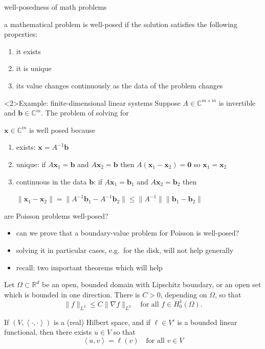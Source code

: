 \documentclass[10pt,
               svgnames,
               hyperref={colorlinks,
                         citecolor=DeepPink4,
                         linkcolor=FireBrick,
                         urlcolor=blue},
               usepdftitle=false]{beamer}
\newcommand{\bb}{\mathbf{b}}
\newcommand{\bx}{\mathbf{x}}
\newcommand{\bzero}{\bm{0}}
\newcommand{\CC}{\mathbb{C}}
\newcommand{\RR}{\mathbb{R}}
\newcommand{\grad}{\nabla}
\newcommand{\ip}[2]{\left<#1,#2\right>}
\begin{document}
\begin{frame}{well-posedness of math problems}

\begin{definition}[Hadamard, 1902]
a mathematical problem is \alert{well-posed} if the solution satisfies the following properties:
\begin{enumerate}
\item it exists
\item it is unique
\item its value changes continuously as the data of the problem changes
\end{enumerate}
\end{definition}

\small
\begin{block}<2>{Example: finite-dimensional linear systems}
Suppose $A\in \CC^{m\times m}$ is invertible and $\bb\in\CC^m$.  The problem of solving \only<1>{$A\bx = \bb$}\only<2>{$\boxed{A\bx = \bb}$} for

$\bx\in\CC^m$ is well posed because
\begin{enumerate}
\item exists: $\bx = A^{-1}\bb$
\item unique: if $A\bx_1=\bb$ and $A\bx_2=\bb$ then $A(\bx_1-\bx_2)=\bzero$ so $\bx_1=\bx_2$
\item continuous in the data $\bb$: if $A\bx_1=\bb_1$ and $A\bx_2=\bb_2$ then

\quad $\|\bx_1-\bx_2\| = \|A^{-1}\bb_1 - A^{-1}\bb_2\| \le \|A^{-1}\| \|\bb_1 - \bb_2\|$
\end{enumerate}
\end{block}
\end{frame}


\begin{frame}{are Poisson problems well-posed?}

\begin{itemize}
\item can we prove that a boundary-value problem for Poisson is well-posed?
\item solving it in particular cases, e.g.~for the disk, will not help generally
\item recall: two important theorems which will help
\end{itemize}

\begin{theorem}
Let $\Omega\subset \RR^d$ be an open, bounded domain with Lipschitz boundary, or an open set which is bounded in one direction.  There is $C>0$, depending on $\Omega$, so that
	$$\|f\|_{L^2} \le C \|\grad f\|_{L^2} \quad \text{for all } f\in H_0^1(\Omega).$$
\end{theorem}

\begin{theorem}
If $(V,\ip{\cdot}{\cdot})$ is a (real) Hilbert space, and if $\ell \in V'$ is a bounded linear functional, then there exists $u\in V$ so that
	$$\ip{u}{v} = \ell(v) \quad \text{for all } v\in V$$
\end{theorem}
\end{frame}
\end{document}
